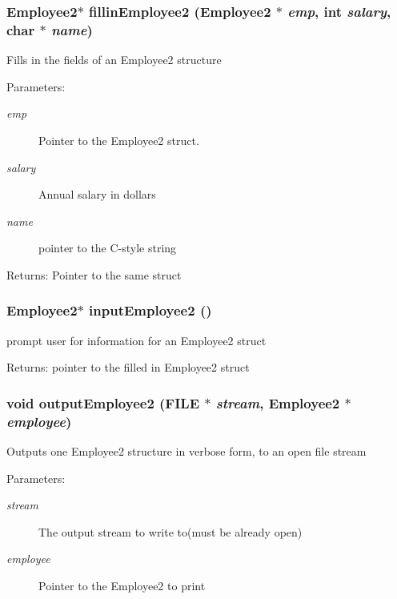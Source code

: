 \subsubsection{\setlength{\rightskip}{0pt plus 5cm}\bf{Employee2}$\ast$ fillin\-Employee2 (\bf{Employee2} $\ast$ {\em emp}, int {\em salary}, char $\ast$ {\em name})}\label{func_8c_86cf0d1af979fb191ae4acddeded053e}


Fills in the fields of an Employee2 structure \begin{Desc}
\item[Parameters:]
\begin{description}
\item[{\em emp}]Pointer to the Employee2 struct. \item[{\em salary}]Annual salary in dollars \item[{\em name}]pointer to the C-style string \end{description}
\end{Desc}
\begin{Desc}
\item[Returns:]Pointer to the same struct \end{Desc}
\subsubsection{\setlength{\rightskip}{0pt plus 5cm}\bf{Employee2}$\ast$ input\-Employee2 ()}\label{func_8c_4bbd1151cc7051aa5bf412b4b7a75c85}


prompt user for information for an Employee2 struct \begin{Desc}
\item[Returns:]pointer to the filled in Employee2 struct \end{Desc}
\subsubsection{\setlength{\rightskip}{0pt plus 5cm}void output\-Employee2 (FILE $\ast$ {\em stream}, \bf{Employee2} $\ast$ {\em employee})}\label{func_8c_b0fbf8b9edeb553d0ae83d43f5540a14}


Outputs one Employee2 structure in verbose form, to an open file stream \begin{Desc}
\item[Parameters:]
\begin{description}
\item[{\em stream}]The output stream to write to(must be already open) \item[{\em employee}]Pointer to the Employee2 to print \end{description}
\end{Desc}
